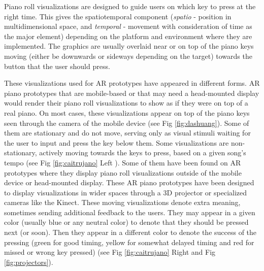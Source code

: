 \documentclass[sigchi, review]{acmart}
\begin{document}
Piano roll visualizations are designed to guide users on which key to press at the right time. This gives the spatiotemporal component (\textit{spatio} - position in multidimensional space, and \textit{temporal} - movement with consideration of time as the major element) depending on the platform and environment where they are implemented. The graphics are usually overlaid near or on top of the piano keys moving (either be downwards or sideways depending on the target) towards the button that the user should press. 

These visualizations used for AR prototypes have appeared in different forms. AR piano prototypes that are mobile-based or that may need a head-mounted display would render their piano roll visualizations to show as if they were on top of a real piano. On most cases, these visualizations appear on top of the piano keys seen through the camera of the mobile device (see Fig \ref{fig:dashuang}). Some of them are stationary and do not move, serving only as visual stimuli waiting for the user to input and press the key below them. Some visualizations are non-stationary, actively moving towards the keys to press, based on a given song's tempo (see Fig \ref{fig:caitrujano} Left ). Some of them have been found on AR prototypes where they display piano roll visualizations outside of the mobile device or head-mounted display. These AR piano prototypes have been designed to display visualizations in wider spaces through a 3D projector or specialized cameras like the Kinect. These moving visualizations denote extra meaning, sometimes sending additional feedback to the users. They may appear in a given color (usually blue or any neutral color) to denote that they should be pressed next (or soon). Then they appear in a different color to denote the success of the pressing (green for good timing, yellow for somewhat delayed timing and red for missed or wrong key pressed) (see Fig \ref{fig:caitrujano} Right and Fig \ref{fig:projectors}). 
\end{document}
